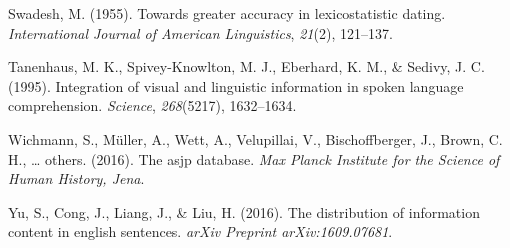 \documentclass[10pt, letterpaper]{article}
\begin{document}
\leavevmode\hypertarget{ref-swadesh1955}{}%
Swadesh, M. (1955). Towards greater accuracy in lexicostatistic dating.
\emph{International Journal of American Linguistics}, \emph{21}(2),
121--137.

\leavevmode\hypertarget{ref-tanenhaus1995}{}%
Tanenhaus, M. K., Spivey-Knowlton, M. J., Eberhard, K. M., \& Sedivy, J.
C. (1995). Integration of visual and linguistic information in spoken
language comprehension. \emph{Science}, \emph{268}(5217), 1632--1634.

\leavevmode\hypertarget{ref-wichmann2016}{}%
Wichmann, S., Müller, A., Wett, A., Velupillai, V., Bischoffberger, J.,
Brown, C. H., \ldots{} others. (2016). The asjp database. \emph{Max
Planck Institute for the Science of Human History, Jena}.

\leavevmode\hypertarget{ref-yu2016}{}%
Yu, S., Cong, J., Liang, J., \& Liu, H. (2016). The distribution of
information content in english sentences. \emph{arXiv Preprint
arXiv:1609.07681}.


\end{document}
